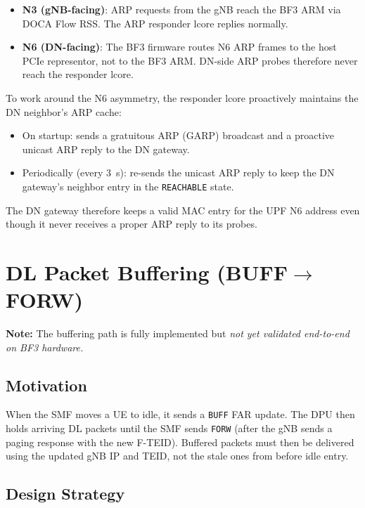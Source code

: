 \documentclass[conference]{IEEEtran}
\begin{document}
\begin{itemize}
  \item \textbf{N3 (gNB-facing)}: ARP requests from the gNB reach the BF3
        ARM via DOCA Flow RSS.  The ARP responder lcore replies normally.

  \item \textbf{N6 (DN-facing)}: The BF3 firmware routes N6 ARP frames to
        the host PCIe representor, not to the BF3 ARM.  DN-side ARP
        probes therefore never reach the responder lcore.
\end{itemize}

To work around the N6 asymmetry, the responder lcore proactively maintains the
DN neighbor's ARP cache:
\begin{itemize}
  \item On startup: sends a gratuitous ARP (GARP) broadcast and a proactive
        unicast ARP reply to the DN gateway.
  \item Periodically (every 3~s): re-sends the unicast ARP reply to keep
        the DN gateway's neighbor entry in the \texttt{REACHABLE} state.
\end{itemize}

The DN gateway therefore keeps a valid MAC entry for the UPF N6
address even though it never receives a proper ARP reply to its
probes.

\section{DL Packet Buffering (BUFF$\to$FORW)}
\label{sec:buffering}

\textbf{Note:} The buffering path is fully implemented but \emph{not yet
validated end-to-end on BF3 hardware.}

\subsection{Motivation}

When the SMF moves a UE to idle, it sends a \texttt{BUFF} FAR
update.  The DPU then holds arriving DL packets until the SMF sends
\texttt{FORW} (after the gNB sends a paging response with the new
F-TEID).  Buffered packets must then be delivered using the updated
gNB IP and TEID, not the stale ones from before idle entry.

\subsection{Design Strategy}
\end{document}
